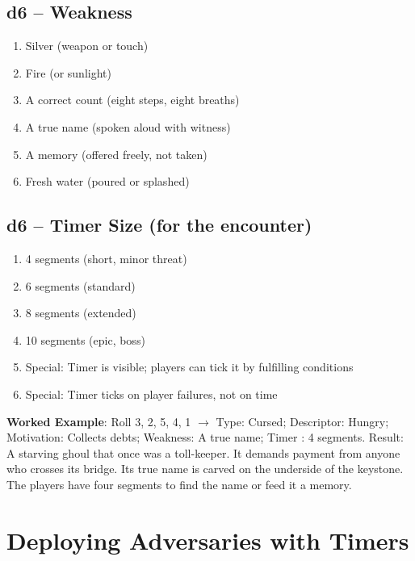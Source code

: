 \subsection*{d6 -- Weakness}
\begin{enumerate}[label=\arabic*.]
    \item Silver (weapon or touch)
    \item Fire (or sunlight)
    \item A correct count (eight steps, eight breaths)
    \item A true name (spoken aloud with witness)
    \item A memory (offered freely, not taken)
    \item Fresh water (poured or splashed)
\end{enumerate}

\subsection*{d6 -- Timer Size (for the encounter)}
\begin{enumerate}[label=\arabic*.]
    \item 4 segments (short, minor threat)
    \item 6 segments (standard)
    \item 8 segments (extended)
    \item 10 segments (epic, boss)
    \item Special: Timer is visible; players can tick it by fulfilling conditions
    \item Special: Timer ticks on player failures, not on time
\end{enumerate}

\noindent\textbf{Worked Example}: Roll 3, 2, 5, 4, 1 $\rightarrow$ Type: Cursed; Descriptor: Hungry; Motivation: Collects debts; Weakness: A true name; Timer : 4 segments. Result: A starving ghoul that once was a toll-keeper. It demands payment from anyone who crosses its bridge. Its true name is carved on the underside of the keystone. The players have four segments to find the name or feed it a memory.


\section*{Deploying Adversaries with Timers}

